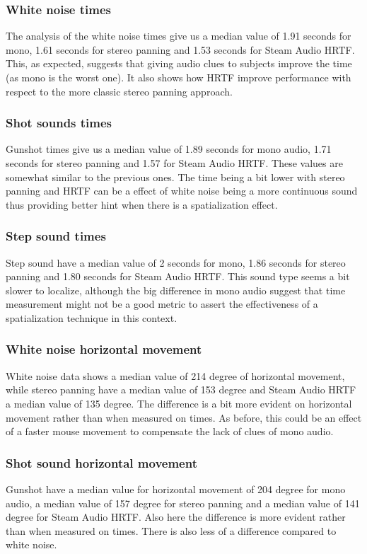 \documentclass[conference]{IEEEtran}
\begin{document}
\subsubsection{White noise times}
The analysis of the white noise times give us a median value of 1.91 seconds for mono, 1.61 seconds for stereo panning and 1.53 seconds for Steam Audio HRTF. This, as expected, suggests that giving audio clues to subjects improve the time (as mono is the worst one). It also shows how HRTF improve performance with respect to the more classic stereo panning approach.\\

\subsubsection{Shot sounds times}
Gunshot times give us a median value of 1.89 seconds for mono audio, 1.71 seconds for stereo panning and 1.57 for Steam Audio HRTF. These values are somewhat similar to the previous ones. The time being a bit lower with stereo panning and HRTF can be a effect of white noise being a more continuous sound thus providing better hint when there is a spatialization effect.\\

\subsubsection{Step sound times}
Step sound have a median value of 2 seconds for mono, 1.86 seconds for stereo panning and 1.80 seconds for Steam Audio HRTF. This sound type seems a bit slower to localize, although the big difference in mono audio suggest that time measurement might not be a good metric to assert the effectiveness of a spatialization technique in this context.\\

\subsubsection{White noise horizontal movement}
White noise data shows a median value of 214 degree of horizontal movement, while stereo panning have a median value of 153 degree and Steam Audio HRTF a median value of 135 degree. The difference is a bit more evident on horizontal movement rather than when measured on times. As before, this could be an effect of a faster mouse movement to compensate the lack of clues of mono audio.\\

\subsubsection{Shot sound horizontal movement}
Gunshot have a median value for horizontal movement of 204 degree for mono audio, a median value of 157 degree for stereo panning and a median value of 141 degree for Steam Audio HRTF. Also here the difference is more evident rather than when measured on times. There is also less of a difference compared to white noise.\\
\end{document}

